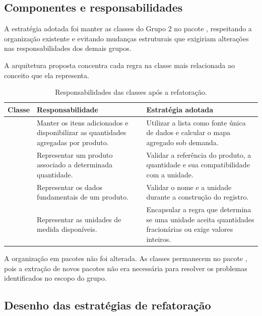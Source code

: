 \subsection{Componentes e responsabilidades}

A estratégia adotada foi manter as classes do Grupo 2 no pacote , respeitando a organização existente e evitando mudanças estruturais que exigiriam alterações nas responsabilidades dos demais grupos.

A arquitetura proposta concentra cada regra na classe mais relacionada ao conceito que ela representa.

\begin{table}[H]\centering\small
\begin{tabularx}{\textwidth}{>{\raggedright\arraybackslash}p{3.2cm}>{\raggedright\arraybackslash}p{4.2cm}Y}
\toprule
\textbf{Classe} & \textbf{Responsabilidade} & \textbf{Estratégia adotada} \\
\midrule
{} & Manter os itens adicionados e disponibilizar as quantidades agregadas por produto. & Utilizar a lista como fonte única de dados e calcular o mapa agregado sob demanda. \\
\addlinespace
{} & Representar um produto associado a determinada quantidade. & Validar a referência do produto, a quantidade e sua compatibilidade com a unidade. \\
\addlinespace
{} & Representar os dados fundamentais de um produto. & Validar o nome e a unidade durante a construção do registro. \\
\addlinespace
{} & Representar as unidades de medida disponíveis. & Encapsular a regra que determina se uma unidade aceita quantidades fracionárias ou exige valores inteiros. \\
\bottomrule
\end{tabularx}
\caption{Responsabilidades das classes após a refatoração.}
\end{table}

A organização em pacotes não foi alterada. As classes permanecem no pacote , pois a extração de novos pacotes não era necessária para resolver os problemas identificados no escopo do grupo.

\subsection{Desenho das estratégias de refatoração}

